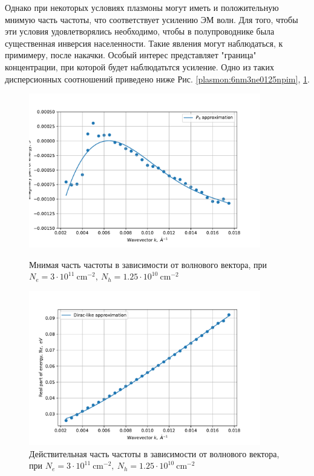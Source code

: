 \documentclass[../main.tex]{subfiles}
\begin{document}
    Однако при некоторых условиях плазмоны могут иметь и положительную мнимую часть частоты, что соответствует усилению ЭМ волн. Для того, 
    чтобы эти условия удовлетворялись необходимо, чтобы в полупроводнике была существенная инверсия населенности. Такие явления 
    могут наблюдаться, к примимеру, после накачки. Особый интерес представляет "граница" концентрации, при которой будет наблюдатьтся 
    усиление. Одно из таких дисперсионных соотношений приведено ниже Рис. \ref{plasmon:6nm3ne0125npim}, \ref{plasmon:6nm3ne0125npre}.

    \begin{figure}[h]
        \begin{minipage}[h]{0.49\textwidth}
            \includegraphics[width=0.9\textwidth]{./images/plasmon_6nm_3_0125_im.pdf}
            \caption{Мнимая часть частоты в зависимости от волнового вектора, при $N_e = 3 \cdot 10^{11}~\text{cm}^{-2},~N_h = 1.25 \cdot 10^{10}~\text{cm}^{-2}$
            \label{plasmon:6nm3ne0125npim}}
        \end{minipage}
        \hfill
        \begin{minipage}[h]{0.49\textwidth}
            \includegraphics[width=0.9\textwidth]{./images/plasmon_6nm_3_0125_re.pdf}
            \caption{Действительная часть частоты в зависимости от волнового вектора, при $N_e = 3 \cdot 10^{11}~\text{cm}^{-2},~N_h = 1.25 \cdot 10^{10}~\text{cm}^{-2}$
            \label{plasmon:6nm3ne0125npre}}
        \end{minipage}
    \end{figure}
\end{document}
